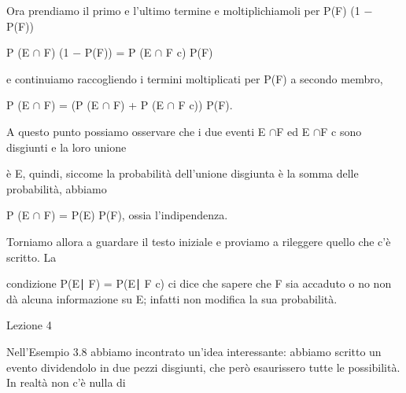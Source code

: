 \documentclass[a4paper,portrait,12pt]{article}
\begin{document}
\begin{flushleft}
Ora prendiamo il primo e l'ultimo termine e moltiplichiamoli per P(F) (1 $-$ P(F))
\end{flushleft}


\begin{flushleft}
P (E $\cap$ F) (1 $-$ P(F)) = P (E $\cap$ F c) P(F)
\end{flushleft}


\begin{flushleft}
e continuiamo raccogliendo i termini moltiplicati per P(F) a secondo membro,
\end{flushleft}


\begin{flushleft}
P (E $\cap$ F) = (P (E $\cap$ F) + P (E $\cap$ F c)) P(F).
\end{flushleft}


\begin{flushleft}
A questo punto possiamo osservare che i due eventi E $\cap$F ed E $\cap$F c sono disgiunti e la loro unione
\end{flushleft}


\begin{flushleft}
\`{e} E, quindi, siccome la probabilit\`{a} dell'unione disgiunta \`{e} la somma delle probabilit\`{a}, abbiamo
\end{flushleft}


\begin{flushleft}
P (E $\cap$ F) = P(E) P(F), ossia l'indipendenza.
\end{flushleft}


\begin{flushleft}
Torniamo allora a guardare il testo iniziale e proviamo a rileggere quello che c'\`{e} scritto. La
\end{flushleft}


\begin{flushleft}
condizione P(E∣ F) = P(E∣ F c) ci dice che sapere che F sia accaduto o no non d\`{a} alcuna informazione su E; infatti non modifica la sua probabilit\`{a}.
\end{flushleft}


\begin{flushleft}
Lezione 4
\end{flushleft}





\begin{flushleft}
Nell'Esempio 3.8 abbiamo incontrato un'idea interessante: abbiamo scritto un evento dividendolo in due pezzi disgiunti, che per\`{o} esaurissero tutte le possibilit\`{a}. In realt\`{a} non c'\`{e} nulla di
\end{flushleft}
\end{document}
